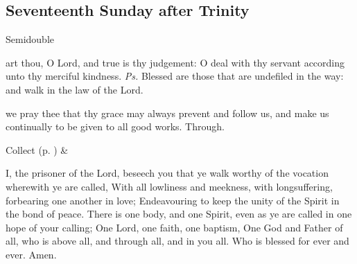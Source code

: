 \subsection{Seventeenth Sunday after Trinity}
\begin{inhead}
{Semidouble}
\end{inhead}


\introit
{} art thou, O Lord, and true is thy judgement: O deal with thy servant according unto thy merciful kindness. \textit{Ps.} Blessed are those that are undefiled in the way: and walk in the law of the Lord.

\collect
{} we pray thee that thy grace may always prevent and follow us, and make us continually to be given to all good works. Through.


\begin{rubric}
     Collect  (p. \pageref{SPSaints}) \&  
\end{rubric}

 I, the prisoner of the Lord, beseech you that ye walk worthy of the vocation wherewith ye are called, With all lowliness and meekness, with longsuffering, forbearing one another in love; Endeavouring to keep the unity of the Spirit in the bond of peace. There is one body, and one Spirit, even as ye are called in one hope of your calling; One Lord, one faith, one baptism, One God and Father of all, who is above all, and through all, and in you all. Who is blessed for ever and ever. Amen.


